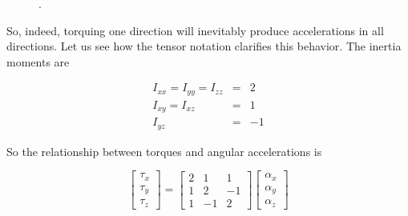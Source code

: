 \begin{figure}
  \begin{center}
  \end{center}
  \caption[]{.}
  \label{fig:tensor22}
\end{figure}


So, indeed, torquing one direction will inevitably produce accelerations in all directions. Let us see how the tensor notation clarifies this behavior. The inertia moments are 

\begin{eqnarray}
I_{xx}=I_{yy}=I_{zz}&=&2\\
I_{xy}=I_{xz}&=&1\\
I_{yz}&=&-1
\end{eqnarray}


So the relationship between torques and angular accelerations is 

\begin{equation}
\left[\begin{array}{c}
\tau_x\\
\tau_y\\
\tau_z
\end{array}\right] = \left[\begin{array}{ccc}
2 & 1 & 1 \\
1 & 2 & -1 \\
1 & -1 & 2
\end{array}\right] 
\left[\begin{array}{c}
\alpha_x\\
\alpha_y\\
\alpha_z
\end{array}\right] 
\end{equation}

